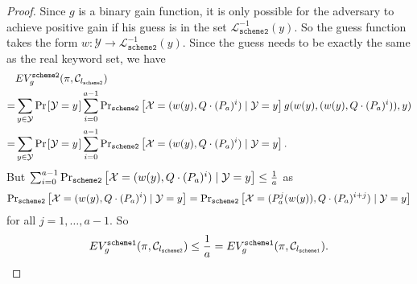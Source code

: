 \begin{proof}
Since $g$ is a binary gain function, it is only possible for the adversary to achieve positive gain if his guess is in the set $\mathcal{L}_\texttt{scheme2}^{-1}(y)$. So the guess function takes the form $w: \mathcal{Y} \rightarrow \mathcal{L}_\texttt{scheme2}^{-1}(y)$. Since the guess needs to be exactly the same as the real keyword set, we have
\begin{align*}
  &EV_g^{\texttt{scheme2}}(\pi, \channel_{\leak_\texttt{scheme2}})\\
= &\sum_{y \in {\mathcal{Y}}} \prob{\mathcal{Y} = y} \sum_{i = 0}^{a-1} \text{Pr}_{\texttt{scheme2}}\left[\mathcal{X} = (w(y), Q \cdot (\perm_a)^i) \mid \mathcal{Y} = y\right] g(w(y), (w(y), Q \cdot (\perm_a)^i)), y) \\
= &\sum_{y \in {\mathcal{Y}}} \prob{\mathcal{Y} = y} \sum_{i = 0}^{a-1} \text{Pr}_{\texttt{scheme2}}\left[\mathcal{X} = (w(y), Q \cdot (\perm_a)^i) \mid \mathcal{Y} = y\right].
\end{align*}
But $\sum_{i = 0}^{a-1} \text{Pr}_{\texttt{scheme2}}\left[\mathcal{X} = (w(y), Q \cdot (P_a)^i) \mid \mathcal{Y} = y\right] \leq \frac{1}{a}$ as
\begin{align*}
	\text{Pr}_{\texttt{scheme2}}\left[\mathcal{X} = (w(y), Q \cdot (P_a)^i) \mid \mathcal{Y} = y\right] = \text{Pr}_{\texttt{scheme2}}\left[\mathcal{X} = (P_a^j(w(y)), Q \cdot (P_a)^{i+j}) \mid \mathcal{Y} = y\right]
\end{align*}
for all $j = 1, \dots, a-1$. So
\begin{align*}
EV_g^{\texttt{scheme1}}(\pi, \mathcal{C}_{l_\texttt{scheme2}}) \leq \frac{1}{a} = EV_g^{\texttt{scheme1}}(\pi, \mathcal{C}_{l_\texttt{scheme1}}).
\end{align*}



\end{proof}
